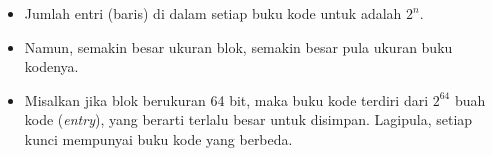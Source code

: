 \documentclass{article}
\begin{document}

\begin{itemize}
    \item Jumlah entri (baris) di dalam setiap buku kode untuk adalah $2^n$.
    \item Namun, semakin besar ukuran blok, semakin besar pula ukuran buku kodenya.
    \item Misalkan jika blok berukuran 64 bit, maka buku kode terdiri dari $2^{64}$ buah kode (\textit{entry}), yang berarti terlalu besar untuk disimpan. Lagipula, setiap kunci mempunyai buku kode yang berbeda.
\end{itemize}
\end{document}

